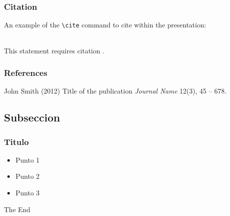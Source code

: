 \documentclass{beamer}
\begin{document}
\begin{frame}[fragile] %
\frametitle{Citation}
An example of the \verb|\cite| command to cite within the presentation:\\~

This statement requires citation \cite{p1}.
\end{frame}


\begin{frame}
\frametitle{References}
\footnotesize{
\begin{thebibliography}{99} %
 John Smith (2012)
\newblock Title of the publication
\newblock \emph{Journal Name} 12(3), 45 -- 678.
\end{thebibliography}
}
\end{frame}


\subsection{Subseccion} %

\begin{frame}
\frametitle{Titulo}
\begin{itemize}
\item Punto 1
\item Punto 2
\item Punto 3
\end{itemize}
\end{frame}


\begin{frame}
\Huge{\centerline{The End}}
\end{frame}

\end{document}
